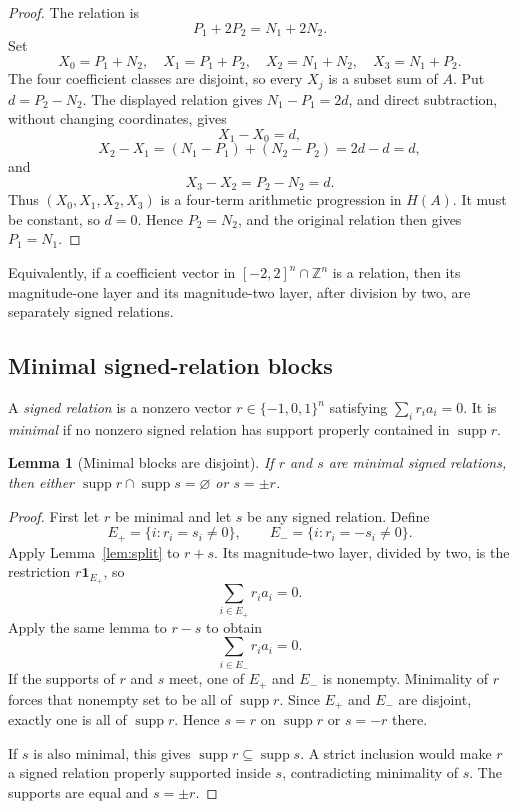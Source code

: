\documentclass[11pt]{article}
\newtheorem{lemma}[theorem]{Lemma}
\theoremstyle{remark}
\newcommand{\Z}{\mathbb Z}
\newcommand{\supp}{\operatorname{supp}}
\begin{document}
\begin{proof}
The relation is
\[
  P_1+2P_2=N_1+2N_2.
\]
Set
\[
  X_0=P_1+N_2,\quad X_1=P_1+P_2,\quad
  X_2=N_1+N_2,\quad X_3=N_1+P_2.
\]
The four coefficient classes are disjoint, so every $X_j$ is a subset sum of
$A$.  Put $d=P_2-N_2$.  The displayed relation gives
$N_1-P_1=2d$, and direct subtraction, without changing coordinates, gives
\[
  X_1-X_0=d,
\]
\[
  X_2-X_1=(N_1-P_1)+(N_2-P_2)=2d-d=d,
\]
and
\[
  X_3-X_2=P_2-N_2=d.
\]
Thus $(X_0,X_1,X_2,X_3)$ is a four-term arithmetic progression in $H(A)$.
It must be constant, so $d=0$.  Hence $P_2=N_2$, and the original relation
then gives $P_1=N_1$.
\end{proof}

Equivalently, if a coefficient vector in $[-2,2]^n\cap\Z^n$ is a relation,
then its magnitude-one layer and its magnitude-two layer, after division by
two, are separately signed relations.

\subsection{Minimal signed-relation blocks}

A \emph{signed relation} is a nonzero vector
$r\in\{-1,0,1\}^n$ satisfying $\sum_i r_i a_i=0$.  It is \emph{minimal} if
no nonzero signed relation has support properly contained in $\supp r$.

\begin{lemma}[Minimal blocks are disjoint]\label{lem:disjoint}
If $r$ and $s$ are minimal signed relations, then either
$\supp r\cap\supp s=\varnothing$ or $s=\pm r$.
\end{lemma}

\begin{proof}
First let $r$ be minimal and let $s$ be any signed relation.  Define
\[
  E_+=\{i:r_i=s_i\ne0\},
  \qquad E_-=\{i:r_i=-s_i\ne0\}.
\]
Apply Lemma~\ref{lem:split} to $r+s$.  Its magnitude-two layer, divided by
two, is the restriction $r\mathbf 1_{E_+}$, so
\[
  \sum_{i\in E_+}r_i a_i=0.
\]
Apply the same lemma to $r-s$ to obtain
\[
  \sum_{i\in E_-}r_i a_i=0.
\]
If the supports of $r$ and $s$ meet, one of $E_+$ and $E_-$ is nonempty.
Minimality of $r$ forces that nonempty set to be all of $\supp r$.  Since
$E_+$ and $E_-$ are disjoint, exactly one is all of $\supp r$.  Hence $s=r$
on $\supp r$ or $s=-r$ there.

If $s$ is also minimal, this gives $\supp r\subseteq\supp s$.  A strict
inclusion would make $r$ a signed relation properly supported inside $s$,
contradicting minimality of $s$.  The supports are equal and $s=\pm r$.
\end{proof}
\end{document}
